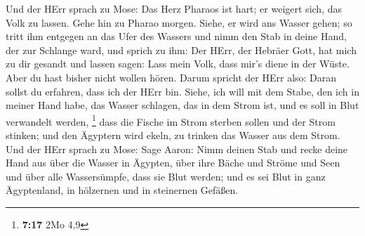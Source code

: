  Und der HErr sprach zu Mose: Das Herz Pharaos ist hart; er
weigert sich, das Volk zu lassen.  Gehe hin zu Pharao
morgen. Siehe, er wird ans Wasser gehen; so tritt ihm entgegen an das
Ufer des Wassers und nimm den Stab in deine Hand, der zur Schlange ward,
 und sprich zu ihm: Der HErr, der Hebräer Gott, hat mich zu
dir gesandt und lassen sagen: Lass mein Volk, dass mir's diene in der
Wüste. Aber du hast bisher nicht wollen hören.  Darum
spricht der HErr also: Daran sollst du erfahren, dass ich der HErr bin.
Siehe, ich will mit dem Stabe, den ich in meiner Hand habe, das Wasser
schlagen, das in dem Strom ist, und es soll in Blut verwandelt werden,
\footnote{\textbf{7:17} 2Mo 4,9}  dass die Fische im Strom
sterben sollen und der Strom stinken; und den Ägyptern wird ekeln, zu
trinken das Wasser aus dem Strom.  Und der HErr sprach zu
Mose: Sage Aaron: Nimm deinen Stab und recke deine Hand aus über die
Wasser in Ägypten, über ihre Bäche und Ströme und Seen und über alle
Wassersümpfe, dass sie Blut werden; und es sei Blut in ganz Ägyptenland,
in hölzernen und in steinernen Gefäßen.

